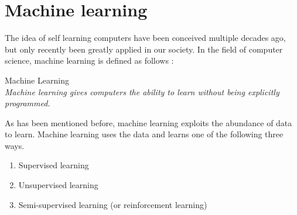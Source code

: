 \begin{comment}
The data that logs can include can be numerical data and non-numerical data
\setlength{\parindent}{3ex}  When we view the 

\cite{Xu2009DetectingLogs}


By comparing a traditional news source with
Topic modelling is a very popular and high researched field. While topic modelling  
An interesting adaptation of topic modelling can be found in twitter and cyber security. Twitter is a interesting field of research with real time tweets and a huge community. Due to the nature of twitter, analysing the huge stream of tweets can be a challenging and exhaustive task. A model with LDA has been introduced to analyse and detect topics. This model is an interesting way to provide news feeds even quicker then traditional news sites. Cyber security has also been an area which LDA seems applicable to. Through the usage of Big data and combination of LDA, users could be identified through system and network logs. Using the event logs to identify topics, new events of users could be identified as malicious or normal 

\end{comment}


\section{Machine learning} \label{theory:machinelearning}
The idea of self learning computers have been conceived multiple decades ago, but only recently been greatly applied in our society.
In the field of computer science, machine learning is defined as follows \cite{Samuel1959SomeCheckers}:\\

\theoremstyle{definition} 
\begin{definition}{Machine Learning} 
\\\textit{Machine learning gives computers the ability to learn without being explicitly programmed.}
\end{definition}


As has  been mentioned before, machine learning exploits the abundance of data to learn. Machine learning uses the data and learns one of the following three ways. 

\begin{enumerate}
    \item Supervised learning
    \item Unsupervised learning
    \item Semi-supervised learning (or reinforcement learning)
\end{enumerate}

